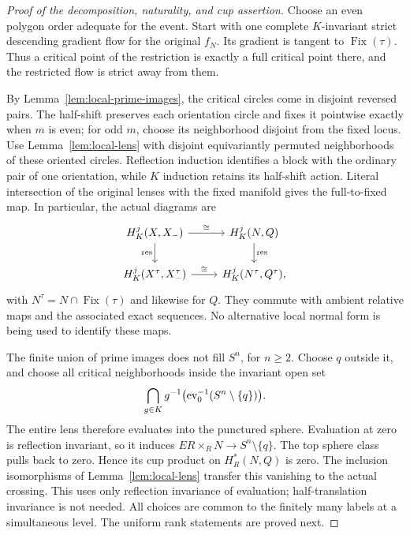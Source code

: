 \begin{proof}[Proof of the decomposition, naturality, and cup assertion]
Choose an even polygon order adequate for the event.  Start with
one complete \(K\)-invariant strict descending gradient flow
for the original \(f_N\).  Its gradient is tangent to
\(\operatorname{Fix}(\tau)\).  Thus a critical point of the
restriction is exactly a full critical point there, and the
restricted flow is strict away from them.

By Lemma~\ref{lem:local-prime-images}, the critical circles
come in disjoint reversed pairs.  The half-shift preserves
each orientation circle and fixes it pointwise exactly when
\(m\) is even; for odd \(m\), choose its neighborhood disjoint
from the fixed locus.  Use Lemma~\ref{lem:local-lens} with
disjoint equivariantly permuted neighborhoods of these
oriented circles.  Reflection induction identifies a block
with the ordinary pair of one orientation, while \(K\)
induction retains its half-shift action.  Literal intersection
of the original lenses with the fixed manifold gives the
full-to-fixed map.  In particular, the actual diagrams are
\[
\begin{tikzcd}
 H_K^j(X,X_-) \arrow[r,"\cong"] \arrow[d,"\res"']
   & H_K^j(N,Q) \arrow[d,"\res"]\\
 H_K^j(X^\tau,X_-^\tau) \arrow[r,"\cong"]
   & H_K^j(N^\tau,Q^\tau),
\end{tikzcd}
\]
with \(N^\tau=N\cap\operatorname{Fix}(\tau)\) and likewise
for \(Q\).  They commute with ambient relative maps and
the associated exact sequences.  No alternative local
normal form is being used to identify these maps.

The finite union of prime images does not fill \(S^n\), for
\(n\ge2\).  Choose \(q\) outside it, and choose all critical
neighborhoods inside the invariant open set
\[
 \bigcap_{g\in K}g^{-1}
       \bigl(\operatorname{ev}_0^{-1}(S^n\setminus\{q\})\bigr).
\]
The entire lens therefore evaluates into the punctured
sphere.  Evaluation at zero is reflection invariant, so it
induces \(ER\times_R N\to S^n\setminus\{q\}\).  The top
sphere class pulls back to zero.  Hence its cup product on
\(H_R^*(N,Q)\) is zero.  The inclusion isomorphisms of
Lemma~\ref{lem:local-lens} transfer this vanishing to the
actual crossing.  This uses only reflection invariance of
evaluation; half-translation invariance is not needed.
All choices are common to the finitely many labels at a
simultaneous level.  The uniform rank statements are proved
next.
\end{proof}

